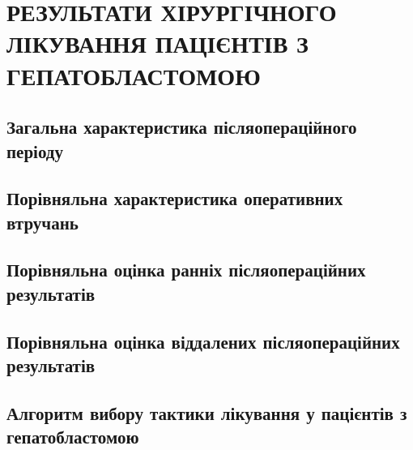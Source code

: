 \chapter{РЕЗУЛЬТАТИ ХІРУРГІЧНОГО ЛІКУВАННЯ ПАЦІЄНТІВ З ГЕПАТОБЛАСТОМОЮ}
\section{Загальна характеристика післяопераційного періоду}
\section{Порівняльна характеристика оперативних втручань}
\section{Порівняльна оцінка ранніх післяопераційних результатів}
\section{Порівняльна оцінка віддалених післяопераційних результатів}
\section{Алгоритм вибору тактики лікування у пацієнтів з гепатобластомою}
